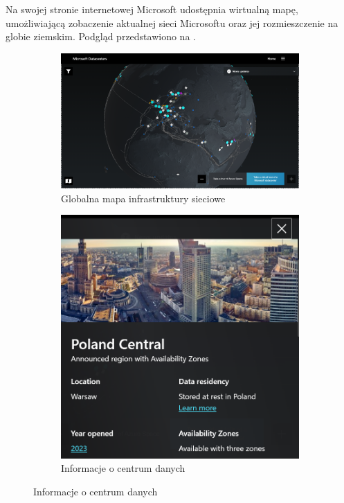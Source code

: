 Na swojej stronie internetowej Microsoft udostępnia wirtualną mapę, umożliwiającą zobaczenie aktualnej sieci Microsoftu oraz jej rozmieszczenie na globie ziemskim. Podgląd przedstawiono na .
\vfill
\pagebreak

\begin{figure}[H]
    \begin{subfigure}[m]{0.7\textwidth}
    \includegraphics[width=\textwidth]{images/azure-ic}
    \caption{Globalna mapa infrastruktury sieciowe}
    \end{subfigure}
    \hfill
    \begin{subfigure}[m]{0.25\textwidth}
        \includegraphics[width=\textwidth]{images/azure-pl}
        \caption{Informacje o centrum danych}
    \end{subfigure}
    \label{fig:azure-ic}
\end{figure}

